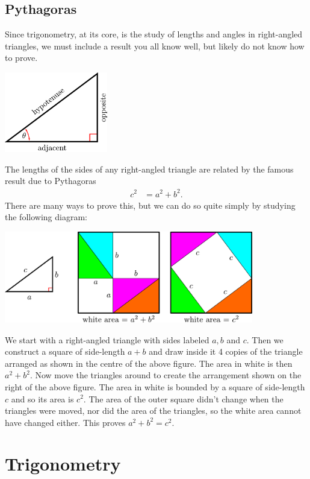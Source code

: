 \subsection{Pythagoras}
Since trigonometry, at its core, is the study of lengths and angles in right-angled
triangles, we must include a result you all know well, but likely do not know how to
prove.
\begin{center}
  \includegraphics[height=3.5cm]{right_triangle}
\end{center}
The lengths of the sides of any right-angled triangle are related by the famous result due to Pythagoras
\begin{align*}
  c^2 &= a^2+b^2.
\end{align*}
There are many ways to prove this, but we can do so quite simply by studying the following diagram:
\begin{center}
  \includegraphics[height=4cm]{pythag}
\end{center}
We start with a right-angled triangle with sides labeled $a,b$ and $c$. Then we construct a square of side-length $a+b$ and draw inside it 4 copies of the triangle arranged as shown in the centre of the above figure. The area in white is then $a^2+b^2$. Now move the triangles around to create the arrangement shown on the right of the above figure. The area in white is bounded by a square of side-length $c$ and so its area is $c^2$. The area of the outer square didn't change when the triangles were moved, nor did the area of the triangles, so the white area cannot have changed either. This proves $a^2+b^2=c^2$.


\section{Trigonometry}
